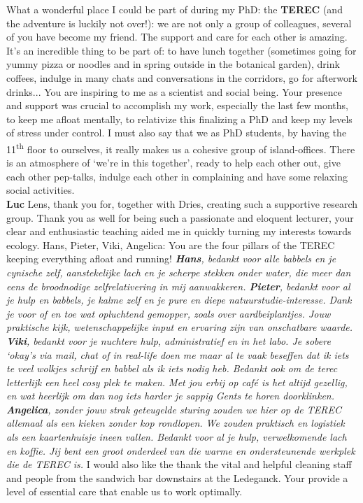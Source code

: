 \documentclass[10pt, twoside]{book} %
\begin{document}
\begin{small}
What a wonderful place I could be part of during my PhD: the \textbf{TEREC} (and the adventure is luckily not over!): we are not only a group of colleagues, several of you have become my friend. The support and care for each other is amazing. It's an incredible thing to be part of: to have lunch together (sometimes going for yummy pizza or noodles and in spring outside in the botanical garden), drink coffees, indulge in many chats and conversations in the corridors, go for afterwork drinks... You are inspiring to me as a scientist and social being. Your presence and support was crucial to accomplish my work, especially the last few months, to keep me afloat mentally, to relativize this finalizing a PhD and keep my levels of stress under control. I must also say that we as PhD students, by having the 11\textsuperscript{th} floor to ourselves, it really makes us a cohesive group of island-offices. There is an atmosphere of `we're in this together', ready to help each other out, give each other pep-talks, indulge each other in complaining and have some relaxing social activities.\\

\textbf{Luc} Lens, thank you for, together with Dries, creating such a supportive research group. Thank you as well for being such a passionate and eloquent lecturer, your clear and enthusiastic teaching aided me in quickly turning my interests towards ecology. Hans, Pieter, Viki, Angelica: You are the four pillars of the TEREC keeping everything afloat and running! \textit{\textbf{Hans}, bedankt voor alle babbels en je cynische zelf, aanstekelijke lach en je scherpe stekken onder water, die meer dan eens de broodnodige zelfrelativering in mij aanwakkeren. \textbf{Pieter}, bedankt voor al je hulp en babbels, je kalme zelf en je pure en diepe natuurstudie-interesse. Dank je voor of en toe wat opluchtend gemopper, zoals over aardbeiplantjes. Jouw praktische kijk, wetenschappelijke input en ervaring zijn van onschatbare waarde. \textbf{Viki}, bedankt voor je nuchtere hulp, administratief en in het labo. Je sobere `okay's via mail, chat of in real-life doen me maar al te vaak beseffen dat ik iets te veel wolkjes schrijf en babbel als ik iets nodig heb. Bedankt ook om de terec letterlijk een heel cosy plek te maken. Met jou erbij op café is het altijd gezellig, en wat heerlijk om dan nog iets harder je sappig Gents te horen doorklinken. \textbf{Angelica}, zonder jouw strak geteugelde sturing zouden we hier op de TEREC allemaal als een kieken zonder kop rondlopen. We zouden praktisch en logistiek als een kaartenhuisje ineen vallen. Bedankt voor al je hulp, verwelkomende lach en koffie. Jij bent een groot onderdeel van die warme en ondersteunende werkplek die de TEREC is.} I would also like the thank the vital and helpful cleaning staff and people from the sandwich bar downstairs at the Ledeganck. Your provide a level of essential care that enable us to work optimally.\\


\end{small}
\end{document}
